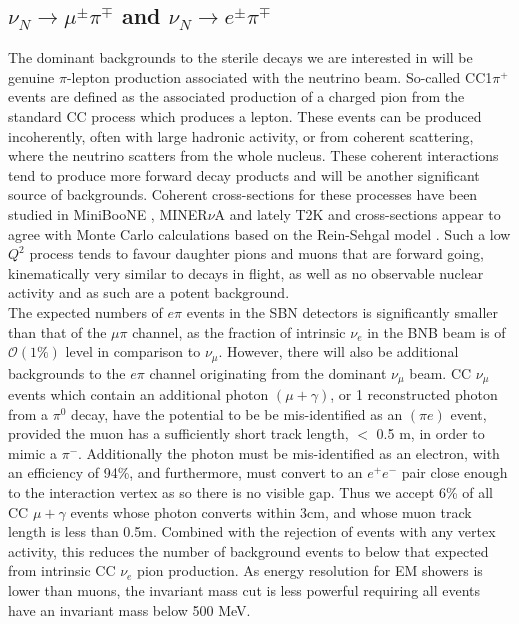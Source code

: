 \documentclass[11pt, a4paper]{article}
\def\minerva{MINER$\nu$A}
\begin{document}
\subsection{$\nu_N \rightarrow \mu^\pm \pi^\mp$ and $\nu_N \rightarrow e^\pm \pi^\mp$   }
The dominant backgrounds to the sterile decays we are interested in will be genuine $\pi$-lepton production associated with
the neutrino beam. So-called CC1$\pi^+$ events are defined as the associated production of a charged pion from the standard CC process which produces a lepton. These events can be produced incoherently, often with large hadronic activity, or from coherent scattering, where the neutrino scatters from the whole nucleus. These coherent interactions tend to produce more forward decay products and will be another significant source of backgrounds. Coherent cross-sections for these processes have been studied in MiniBooNE \cite{Wascko:2006tx}, \minerva \cite{Eberly:2014mra} and lately T2K and cross-sections appear to agree with Monte Carlo calculations based on the Rein-Sehgal model \cite{Rein:2006di, Rein:1982pf}.
Such a low $Q^2$ process tends to favour daughter pions and muons that are forward going, kinematically very similar to decays in flight, as well as no observable nuclear activity and as such are a potent background.\\ 

The expected numbers of $e \pi$ events in the SBN detectors is significantly smaller than that of the $\mu \pi$ channel, as the fraction of intrinsic $\nu_e$ in the BNB beam is of
$\mathcal{O}(1\%)$ level in comparison to $\nu_\mu$. However, there will also be additional backgrounds to the
$e \pi$ channel originating from the dominant $\nu_\mu$ beam. CC $\nu_\mu$ events which contain an additional photon $(\mu+\gamma)$, or 1 reconstructed photon from a $\pi^0$ decay, have the potential to be be mis-identified as an $(\pi
e)$ event, provided the muon has a sufficiently short track length, $<$ 0.5 m, in order to mimic a $\pi^-$. Additionally the photon must be mis-identified as an electron, with an efficiency of 94\%, and furthermore, must convert to an $e^+e^-$ pair close enough to the interaction vertex as so there is no visible gap. Thus we accept 6\% of all CC $\mu+\gamma$ events whose photon converts within 3cm, and whose muon track length is less than 0.5m. Combined with the rejection of events with any vertex activity, this reduces the number of background events to below that expected from intrinsic CC $\nu_e$ pion production. As energy resolution for EM showers is lower than muons, the invariant mass cut is less powerful requiring all events have an invariant mass below 500 MeV. 
\end{document}
